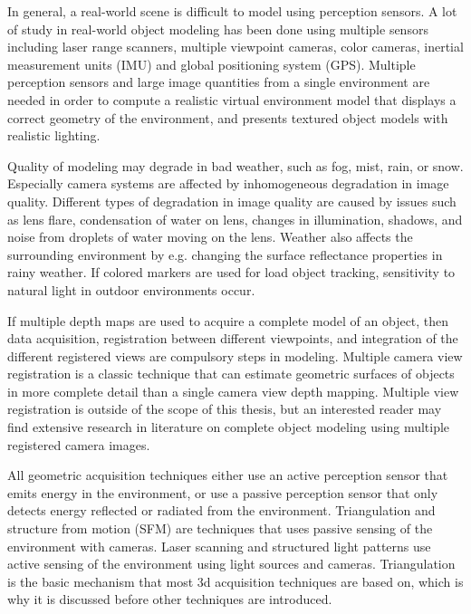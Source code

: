 \documentclass[12pt,a4paper,oneside,pdftex]{report}
\begin{document}
In general, a real-world scene is difficult to model using perception sensors. A lot of study in real-world object modeling has been done using multiple sensors including laser range scanners, multiple viewpoint cameras, color cameras, inertial measurement units (IMU) and global positioning system (GPS). Multiple perception sensors and large image quantities from a single environment are needed in order to compute a realistic virtual environment model that displays a correct geometry of the environment, and presents textured object models with realistic lighting. \citep{ElHakim98}

Quality of modeling may degrade in bad weather, such as fog, mist, rain, or snow. Especially camera systems are affected by inhomogeneous degradation in image quality. Different types of degradation in image quality are caused by issues such as lens flare, condensation of water on lens, changes in illumination, shadows, and noise from droplets of water moving on the lens. Weather also affects the surrounding environment by e.g. changing the surface reflectance properties in rainy weather. If colored markers are used for load object tracking, sensitivity to natural light in outdoor environments occur. \citep{Kawai12} 

If multiple depth maps are used to acquire a complete model of an object, then data acquisition, registration between different viewpoints, and integration of the different registered views are compulsory steps in modeling.  Multiple camera view registration is a classic technique that can estimate geometric surfaces of objects in more complete detail than a single camera view depth mapping. Multiple view registration is outside of the scope of this thesis, but an interested reader may find extensive research in literature on complete object modeling using multiple registered camera images. \citep{Chen91}

All geometric acquisition techniques either use an active perception sensor that emits energy in the environment, or use a passive perception sensor that only detects energy reflected or radiated from the environment. Triangulation and structure from motion (SFM) are techniques that uses passive sensing of the environment with cameras. Laser scanning and structured light patterns use active sensing of the environment using light sources and cameras.
Triangulation is the basic mechanism that most 3d acquisition techniques are based on, which is why it is discussed before other techniques are introduced.
\end{document}
